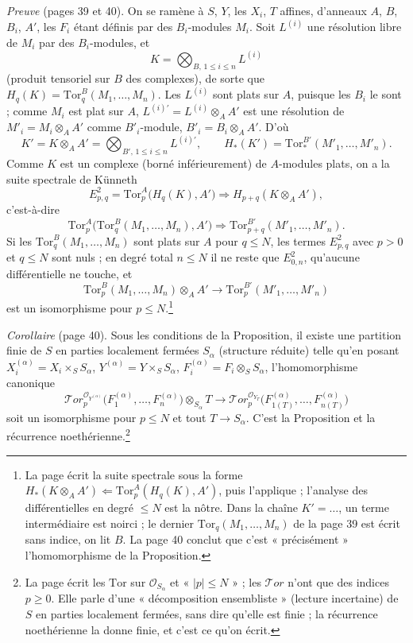 \documentclass[11pt,a4paper]{article}
\begin{document}
\emph{Preuve} (pages 39 et 40). On se ramène à $S$, $Y$, les $X_i$, $T$
affines, d'anneaux $A$, $B$, $B_i$, $A'$, les $F_i$ étant définis par des
$B_i$-modules $M_i$. Soit $L^{(i)}$ une résolution libre de $M_i$ par des
$B_i$-modules, et
\[
  K = \bigotimes_{B,\, 1 \leq i \leq n} L^{(i)}
\]
(produit tensoriel sur $B$ des complexes), de sorte que
$H_{q}(K) = \mathrm{Tor}^{B}_{q}(M_1, \ldots, M_n)$. Les $L^{(i)}$ sont
plats sur $A$, puisque les $B_i$ le sont ; comme $M_i$ est plat sur $A$,
$L^{(i)\prime} = L^{(i)} \otimes_A A'$ est une résolution de
$M'_i = M_i \otimes_A A'$ comme $B'_i$-module, $B'_i = B_i \otimes_A A'$.
D'où
\[
  K' = K \otimes_A A' = \bigotimes_{B',\, 1 \leq i \leq n} L^{(i)\prime},
  \qquad H_{*}(K') = \mathrm{Tor}^{B'}_{*}(M'_1, \ldots, M'_n).
\]
Comme $K$ est un complexe (borné inférieurement) de $A$-modules plats, on a
la suite spectrale de Künneth
\[
  E^{2}_{p,q} = \mathrm{Tor}^{A}_{p}\bigl(H_{q}(K), A'\bigr) \Longrightarrow
  H_{p+q}(K \otimes_A A'),
\]
c'est-à-dire
\[
  \mathrm{Tor}^{A}_{p}\bigl(\mathrm{Tor}^{B}_{q}(M_1, \ldots, M_n), A'\bigr)
  \Longrightarrow \mathrm{Tor}^{B'}_{p+q}(M'_1, \ldots, M'_n).
\]
Si les $\mathrm{Tor}^{B}_{q}(M_1, \ldots, M_n)$ sont plats sur $A$ pour
$q \leq N$, les termes $E^{2}_{p,q}$ avec $p > 0$ et $q \leq N$ sont nuls ;
en degré total $n \leq N$ il ne reste que $E^{2}_{0,n}$, qu'aucune
différentielle ne touche, et
\[
  \mathrm{Tor}^{B}_{p}(M_1, \ldots, M_n) \otimes_A A' \longrightarrow
  \mathrm{Tor}^{B'}_{p}(M'_1, \ldots, M'_n)
\]
est un isomorphisme pour $p \leq N$.\footnote{La page écrit la suite
spectrale sous la forme $H_{*}(K \otimes_A A') \Leftarrow
\mathrm{Tor}^{A}_{p}(H_q(K), A')$, puis l'applique ; l'analyse des
différentielles en degré $\leq N$ est la nôtre. Dans la chaîne
$K' = \ldots$, un terme intermédiaire est noirci ; le dernier
$\mathrm{Tor}_{q}(M_1, \ldots, M_n)$ de la page 39 est écrit sans indice,
on lit $B$. La page 40 conclut que c'est « précisément » l'homomorphisme
de la Proposition.}

\emph{Corollaire} (page 40). Sous les conditions de la Proposition, il
existe une partition finie de $S$ en
parties localement fermées $S_\alpha$ (structure réduite) telle qu'en posant
$X^{(\alpha)}_i = X_i \times_S S_\alpha$, $Y^{(\alpha)} = Y \times_S S_\alpha$,
$F^{(\alpha)}_i = F_i \otimes_S S_\alpha$, l'homomorphisme canonique
\[
  \mathcal{T}or^{\mathcal{O}_{Y^{(\alpha)}}}_{p}\bigl(F^{(\alpha)}_1, \ldots,
  F^{(\alpha)}_n\bigr) \otimes_{S_\alpha} T \longrightarrow
  \mathcal{T}or^{\mathcal{O}_{Y_T}}_{p}\bigl(F^{(\alpha)}_{1(T)}, \ldots,
  F^{(\alpha)}_{n(T)}\bigr)
\]
soit un isomorphisme pour $p \leq N$ et tout $T \to S_\alpha$. C'est la
Proposition et la récurrence noethérienne.\footnote{La page écrit les
$\mathrm{Tor}$ sur $\mathcal{O}_{S_\alpha}$ et « $|p| \leq N$ » ; les
$\mathcal{T}or$ n'ont que des indices $p \geq 0$. Elle parle d'une
« décomposition ensembliste » (lecture incertaine) de $S$ en parties
localement fermées, sans dire qu'elle est finie ; la récurrence
noethérienne la donne finie, et c'est ce qu'on écrit.}
\end{document}
